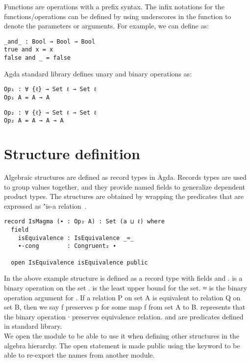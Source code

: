 Functions are operations with a prefix syntax. The infix notations for the
functions/operations can be defined by using underscores in the function to
denote the parameters or arguments. For example, we can define  as:
\begin{verbatim}
_and_ : Bool → Bool → Bool
true and x = x
false and _ = false
\end{verbatim}
Agda standard library defines unary  and binary
 operations as:
\begin{verbatim}
Op₁ : ∀ {ℓ} → Set ℓ → Set ℓ
Op₁ A = A → A
\end{verbatim}
\begin{verbatim}
Op₂ : ∀ {ℓ} → Set ℓ → Set ℓ
Op₂ A = A → A → A
\end{verbatim}

\section{Structure definition}
Algebraic structures are defined as record types in Agda. Records types are used
to group values together, and they provide named fields to generalize dependent
product types. The structures are obtained by wrapping the predicates that are
expressed as "is-a relation~\citep{hu2021formalizing}.
\begin{verbatim}
record IsMagma (∙ : Op₂ A) : Set (a ⊔ ℓ) where
  field
    isEquivalence : IsEquivalence _≈_
    ∙-cong        : Congruent₂ ∙

  open IsEquivalence isEquivalence public
\end{verbatim}
In the above example structure  is defined as a record type with
fields  and .  is a binary
operation on the set .  is the least upper bound for the
set. \textunderscore  ≈ \textunderscore is the binary operation argument for
. If a relation P on set A is equivalent to relation Q on
set B, then we say f preserves p for some map f from set A to B.
 represents that the binary operation ∙ preserves
equivalence relation.  and  are
predicates defined in standard library.\\
We open the module  to be able to use it when defining other
structures in the algebra hierarchy. The open statement is made public using the
keyword  to be able to re-export the names from another module.


